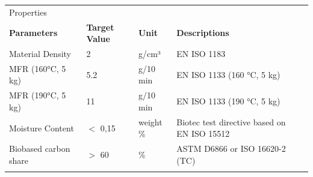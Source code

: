 \documentclass{article}
\begin{document}
\begin{center}
\begin{tabularx}
{\textwidth}{X l  l  l  l }\rowcolor{color_title}Properties &  &  &  &  \\
\textbf{Parameters} & \textbf{Target Value} & \textbf{Unit} & \textbf{Descriptions} &  \\
Material Density  & 2 & g/cm³ & EN ISO 1183 &  \\
\arrayrulecolor{line_color}\hline
MFR (160°C, 5 kg) & 5.2 & g/10 min & EN ISO 1133 (160 °C, 5 kg) &  \\
\arrayrulecolor{line_color}\hline
MFR (190°C, 5 kg) & 11 & g/10 min & EN ISO 1133 (190 °C, 5 kg) &  \\
\arrayrulecolor{line_color}\hline
Moisture Content & \(<\) 0,15 & weight \% & Biotec test directive based on EN ISO 15512 &  \\
\arrayrulecolor{line_color}\hline
Biobased carbon share & \(>\) 60 & \% & ASTM D6866 or ISO 16620-2 (TC) &  \\
\arrayrulecolor{line_color}\hline

\end{tabularx}
\end{center}
\end{document}

